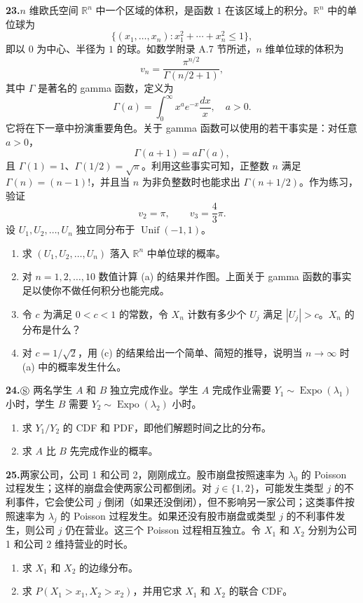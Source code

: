 \documentclass[UTF8, 12pt, fontset=fandol, oneside]{ctexart}
\begin{document}
\noindent\textbf{23.}\quad $n$ 维欧氏空间 $\mathbb{R}^n$ 中一个区域的体积，是函数 $1$ 在该区域上的积分。$\mathbb{R}^n$ 中的单位球为
\[
  \{(x_1,\ldots,x_n):x_1^2+\cdots+x_n^2\le 1\},
\]
即以 $0$ 为中心、半径为 $1$ 的球。如数学附录 A.7 节所述，$n$ 维单位球的体积为
\[
  v_n=\frac{\pi^{n/2}}{\Gamma(n/2+1)},
\]
其中 $\Gamma$ 是著名的 gamma 函数，定义为
\[
  \Gamma(a)=\int_0^\infty x^a e^{-x}\frac{dx}{x},\quad a>0.
\]
它将在下一章中扮演重要角色。关于 gamma 函数可以使用的若干事实是：对任意 $a>0$，
\[
  \Gamma(a+1)=a\Gamma(a),
\]
且 $\Gamma(1)=1$、$\Gamma(1/2)=\sqrt{\pi}$。利用这些事实可知，正整数 $n$ 满足 $\Gamma(n)=(n-1)!$，并且当 $n$ 为非负整数时也能求出 $\Gamma(n+1/2)$。作为练习，验证
\[
  v_2=\pi,\qquad v_3=\frac43\pi.
\]
设 $U_1,U_2,\ldots,U_n$ 独立同分布于 $\operatorname{Unif}(-1,1)$。
\begin{enumerate}
  \item[(a)] 求 $(U_1,U_2,\ldots,U_n)$ 落入 $\mathbb{R}^n$ 中单位球的概率。
  \item[(b)] 对 $n=1,2,\ldots,10$ 数值计算 (a) 的结果并作图。上面关于 gamma 函数的事实足以使你不做任何积分也能完成。
  \item[(c)] 令 $c$ 为满足 $0<c<1$ 的常数，令 $X_n$ 计数有多少个 $U_j$ 满足 $|U_j|>c$。$X_n$ 的分布是什么？
  \item[(d)] 对 $c=1/\sqrt2$，用 (c) 的结果给出一个简单、简短的推导，说明当 $n\to\infty$ 时 (a) 中的概率发生什么。
\end{enumerate}

\noindent\textbf{24.}\quad $\circledS$ 两名学生 $A$ 和 $B$ 独立完成作业。学生 $A$ 完成作业需要 $Y_1\sim \operatorname{Expo}(\lambda_1)$ 小时，学生 $B$ 需要 $Y_2\sim \operatorname{Expo}(\lambda_2)$ 小时。
\begin{enumerate}
  \item[(a)] 求 $Y_1/Y_2$ 的 CDF 和 PDF，即他们解题时间之比的分布。
  \item[(b)] 求 $A$ 比 $B$ 先完成作业的概率。
\end{enumerate}

\noindent\textbf{25.}\quad 两家公司，公司 1 和公司 2，刚刚成立。股市崩盘按照速率为 $\lambda_0$ 的 Poisson 过程发生；这样的崩盘会使两家公司都倒闭。对 $j\in\{1,2\}$，可能发生类型 $j$ 的不利事件，它会使公司 $j$ 倒闭（如果还没倒闭），但不影响另一家公司；这类事件按照速率为 $\lambda_j$ 的 Poisson 过程发生。如果还没有股市崩盘或类型 $j$ 的不利事件发生，则公司 $j$ 仍在营业。这三个 Poisson 过程相互独立。令 $X_1$ 和 $X_2$ 分别为公司 1 和公司 2 维持营业的时长。
\begin{enumerate}
  \item[(a)] 求 $X_1$ 和 $X_2$ 的边缘分布。
  \item[(b)] 求 $P(X_1>x_1,X_2>x_2)$，并用它求 $X_1$ 和 $X_2$ 的联合 CDF。
\end{enumerate}
\end{document}
